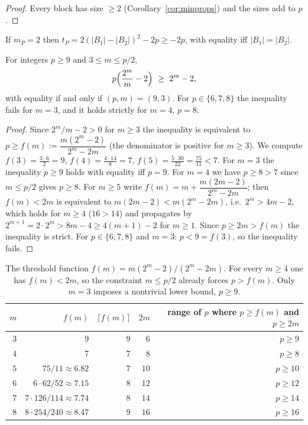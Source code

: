 \begin{proof}
Every block has size $\ge2$ (Corollary~\ref{cor:minprops}) and the sizes add to $p$.
\end{proof}

\begin{lemma}\label{lem:t2}
If $m_P=2$ then $t_P=2(|B_1|-|B_2|)^2-2p\ge-2p$, with equality iff $|B_1|=|B_2|$.
\end{lemma}

\begin{lemma}\label{lem:threshold}
For integers $p\ge9$ and $3\le m\le p/2$,
\[
p\Bigl(\frac{2^m}{m}-2\Bigr)\ \ge\ 2^m-2,
\]
with equality if and only if $(p,m)=(9,3)$. For $p\in\{6,7,8\}$ the inequality fails for $m=3$, and it holds strictly for $m=4$, $p=8$.
\end{lemma}

\begin{proof}
Since $2^m/m-2>0$ for $m\ge3$ the inequality is equivalent to $p\ge f(m):=\dfrac{m(2^m-2)}{2^m-2m}$ (the denominator is positive for $m\ge3$). We compute $f(3)=\frac{3\cdot6}{2}=9$, $f(4)=\frac{4\cdot14}{8}=7$, $f(5)=\frac{5\cdot30}{22}=\frac{75}{11}<7$. For $m=3$ the inequality $p\ge9$ holds with equality iff $p=9$. For $m=4$ we have $p\ge8>7$ since $m\le p/2$ gives $p\ge8$. For $m\ge5$ write $f(m)=m+\dfrac{m(2m-2)}{2^m-2m}$; then $f(m)<2m$ is equivalent to $m(2m-2)<m(2^m-2m)$, i.e.\ $2^m>4m-2$, which holds for $m\ge4$ ($16>14$) and propagates by $2^{m+1}=2\cdot2^m>8m-4\ge4(m+1)-2$ for $m\ge1$. Since $p\ge2m>f(m)$ the inequality is strict. For $p\in\{6,7,8\}$ and $m=3$: $p<9=f(3)$, so the inequality fails.
\end{proof}

\begin{table}[ht]
\centering\small
\begin{tabular}{@{}rrrrr@{}}
\toprule
$m$ & $f(m)$ & $\lceil f(m)\rceil$ & $2m$ & range of $p$ where $p\ge f(m)$ and $p\ge2m$ \\
\midrule
$3$ & $9$ & $9$ & $6$ & $p\ge9$\\
$4$ & $7$ & $7$ & $8$ & $p\ge8$\\
$5$ & $75/11\approx6.82$ & $7$ & $10$ & $p\ge10$\\
$6$ & $6\cdot62/52\approx7.15$ & $8$ & $12$ & $p\ge12$\\
$7$ & $7\cdot126/114\approx7.74$ & $8$ & $14$ & $p\ge14$\\
$8$ & $8\cdot254/240\approx8.47$ & $9$ & $16$ & $p\ge16$\\
\bottomrule
\end{tabular}
\caption{The threshold function $f(m)=m(2^m-2)/(2^m-2m)$. For every $m\ge4$ one has $f(m)<2m$, so the constraint $m\le p/2$ already forces $p>f(m)$. Only $m=3$ imposes a nontrivial lower bound, $p\ge9$.}\label{tab:threshold}
\end{table}

